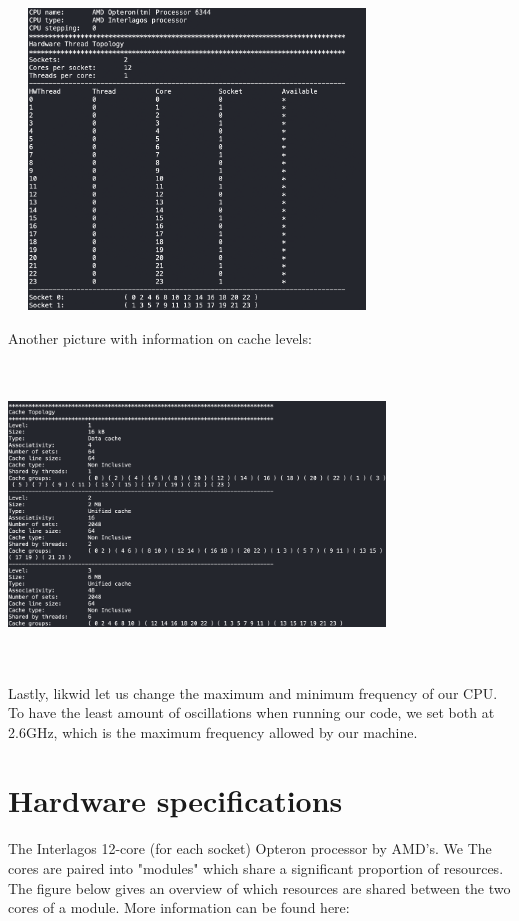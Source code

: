 \documentclass[11pt,a4paper,oneside,titlepage,openright]{book}
\begin{document}
\begin{center}
\includegraphics[width=10cm, height=8cm]{topology_1}
\end{center}
Another picture with information on cache levels:\\
\begin{center}
\includegraphics[width=10cm, height=8cm]{topology_2}
\end{center}
Lastly, likwid let us change the maximum and minimum frequency of our CPU. To have the least amount of oscillations when running our code, we set both at 2.6GHz, which is the maximum frequency allowed by our machine.

\section{Hardware specifications}
The Interlagos 12-core (for each socket) Opteron processor by AMD's. We  The cores are paired into "modules" which share a significant proportion of resources. The figure below gives an overview of which resources are shared between the two cores of a module. More information can be found here: \cite{interlagos}
\end{document}
